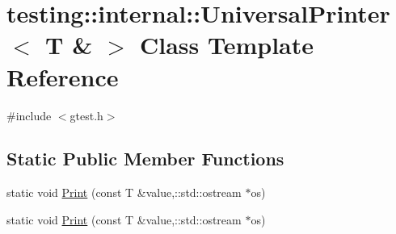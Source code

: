 \hypertarget{classtesting_1_1internal_1_1_universal_printer_3_01_t_01_6_01_4}{\section{testing\-:\-:internal\-:\-:Universal\-Printer$<$ T \& $>$ Class Template Reference}
\label{classtesting_1_1internal_1_1_universal_printer_3_01_t_01_6_01_4}
}


{\ttfamily \#include $<$gtest.\-h$>$}

\subsection*{Static Public Member Functions}
\begin{DoxyCompactItemize}
\item 
static void \hyperlink{classtesting_1_1internal_1_1_universal_printer_3_01_t_01_6_01_4_a2a63ddb20294c4234b7e8f3c7a56355d}{Print} (const T \&value,\-::std\-::ostream $\ast$os)
\item 
static void \hyperlink{classtesting_1_1internal_1_1_universal_printer_3_01_t_01_6_01_4_a2a63ddb20294c4234b7e8f3c7a56355d}{Print} (const T \&value,\-::std\-::ostream $\ast$os)
\end{DoxyCompactItemize}


